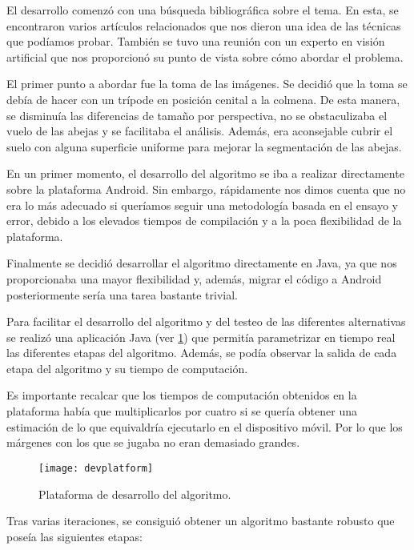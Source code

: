 El desarrollo comenzó con una búsqueda bibliográfica sobre el tema. En
esta, se encontraron varios artículos relacionados que nos dieron una
idea de las técnicas que podíamos probar. También se tuvo una reunión
con un experto en visión artificial que nos proporcionó su punto de
vista sobre cómo abordar el problema.

El primer punto a abordar fue la toma de las imágenes. Se decidió que la
toma se debía de hacer con un trípode en posición cenital a la colmena.
De esta manera, se disminuía las diferencias de tamaño por perspectiva,
no se obstaculizaba el vuelo de las abejas y se facilitaba el análisis.
Además, era aconsejable cubrir el suelo con alguna superficie uniforme
para mejorar la segmentación de las abejas.


En un primer momento, el desarrollo del algoritmo se iba a realizar
directamente sobre la plataforma Android. Sin embargo, rápidamente nos
dimos cuenta que no era lo más adecuado si queríamos seguir una
metodología basada en el ensayo y error, debido a los elevados tiempos
de compilación y a la poca flexibilidad de la plataforma.

Finalmente se decidió desarrollar el algoritmo directamente en Java, ya
que nos proporcionaba una mayor flexibilidad y, además, migrar el código
a Android posteriormente sería una tarea bastante trivial.

Para facilitar el desarrollo del algoritmo y del testeo de las
diferentes alternativas se realizó una aplicación Java (ver \ref{fig:devplatform1}) 
que permitía parametrizar en tiempo real las diferentes etapas del algoritmo.
Además, se podía observar la salida de cada etapa del algoritmo y su tiempo de
computación.

Es importante recalcar que los tiempos de computación obtenidos en la
plataforma había que multiplicarlos por cuatro si se quería obtener una
estimación de lo que equivaldría ejecutarlo en el dispositivo móvil. Por
lo que los márgenes con los que se jugaba no eran demasiado grandes.

\begin{figure}[H]
	\centering
	\texttt{[image: devplatform]}
	\caption{Plataforma de desarrollo del algoritmo.}
	\label{fig:devplatform1}
\end{figure}

Tras varias iteraciones, se consiguió obtener un algoritmo bastante
robusto que poseía las siguientes etapas:

